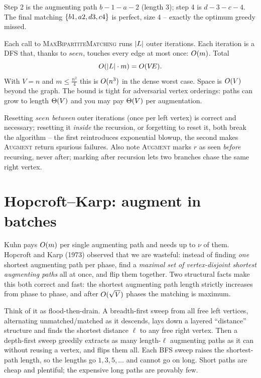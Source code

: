 Step 2 is the augmenting path $b\!-\!1\!-\!a\!-\!2$ (length $3$); step 4 is
$d\!-\!3\!-\!c\!-\!4$. The final matching $\{b1,a2,d3,c4\}$ is perfect, size
$4$ -- exactly the optimum greedy missed.

\begin{complexitybox}
Each call to \textsc{MaxBipartiteMatching} runs $\lvert L\rvert$ outer iterations. Each
iteration is a DFS that, thanks to $\mathit{seen}$, touches every edge at most
once: $O(m)$. Total \[ O(\lvert L\rvert\cdot m)=O(V\!E). \] With $V=n$ and
$m\le\frac{n^2}{4}$ this is $O(n^3)$ in the dense worst case. Space is $O(V)$
beyond the graph. The bound is tight for adversarial vertex orderings: paths can
grow to length $\Theta(V)$ and you may pay $\Theta(V)$ per augmentation.
\end{complexitybox}

\begin{trapbox}
Resetting $\mathit{seen}$ \emph{between} outer iterations (once per left vertex)
is correct and necessary; resetting it \emph{inside} the recursion, or forgetting
to reset it, both break the algorithm -- the first reintroduces exponential
blowup, the second makes \textsc{Augment} return spurious failures. Also note
\textsc{Augment} marks $r$ as seen \emph{before} recursing, never after; marking
after recursion lets two branches chase the same right vertex.
\end{trapbox}

\section{Hopcroft--Karp: augment in batches}
\label{ch15:hk}

Kuhn pays $O(m)$ per single augmenting path and needs up to $\nu$ of them.
Hopcroft and Karp (1973) observed that we are wasteful: instead of finding
\emph{one} shortest augmenting path per phase, find a \emph{maximal set of
vertex-disjoint shortest augmenting paths} all at once, and flip them together.
Two structural facts make this both correct and fast: the shortest augmenting
path length strictly increases from phase to phase, and after $O(\sqrt{V})$
phases the matching is maximum.

\begin{intuitionbox}
Think of it as flood-then-drain. A breadth-first sweep from all free left
vertices, alternating unmatched/matched as it descends, lays down a layered
``distance'' structure and finds the shortest distance $\ell$ to any free right
vertex. Then a depth-first sweep greedily extracts as many length-$\ell$
augmenting paths as it can without reusing a vertex, and flips them all. Each BFS
sweep raises the shortest-path length, so the lengths go $1,3,5,\dots$ and cannot
go on long. Short paths are cheap and plentiful; the expensive long paths are
provably few.
\end{intuitionbox}

